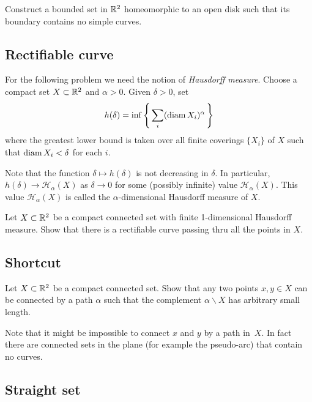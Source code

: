 \begin{pr}
Construct 
a bounded set in $\mathbb{R}^2$
homeomorphic to an open disk
such that 
its boundary contains no simple curves.
\end{pr}

\subsection*{Rectifiable curve}
\label{Rectifiable curve}

For the following problem we need the notion of 
\emph{Hausdorff measure}.
Choose a compact set $X\subset\mathbb{R}^2$ and $\alpha>0$.
Given $\delta>0$, set
\[h(\delta)=\inf\left\{\,\sum_i(\operatorname{\rm diam}\nolimits X_i)^\alpha\,\right\}\]
where the greatest lower bound is taken over all finite coverings $\{X_i\}$ of $X$ 
such that $\operatorname{\rm diam}\nolimits X_i<\delta$ for each $i$.

Note that the function $\delta\mapsto h(\delta)$ is not decreasing in $\delta$.
In particular, $h(\delta)\to \mathcal{H}_\alpha(X)$ as $\delta\to 0$ for some (possibly infinite) value $\mathcal{H}_\alpha(X)$.
This value $\mathcal{H}_\alpha(X)$ is called the $\alpha$-dimensional Hausdorff measure of $X$.

\begin{pr}
Let $X\subset \mathbb{R}^2$ be a compact connected set
with finite 1-dimensional Hausdorff measure. 
Show that there is a rectifiable curve passing thru all the points in $X$.
\end{pr}

\subsection*{Shortcut\hard}

\begin{pr}
Let $X\subset \mathbb{R}^2$ be a compact connected set. 
Show that any two points $x,y\in X$ can be connected by a path $\alpha$ such that the complement $\alpha\backslash X$ has arbitrary small length.
\end{pr}

Note that it might be impossible to connect $x$ and $y$ by a path in~$X$.
In fact there are connected sets in the plane (for example the pseudo-arc) that contain no curves.

\subsection*{Straight set}


